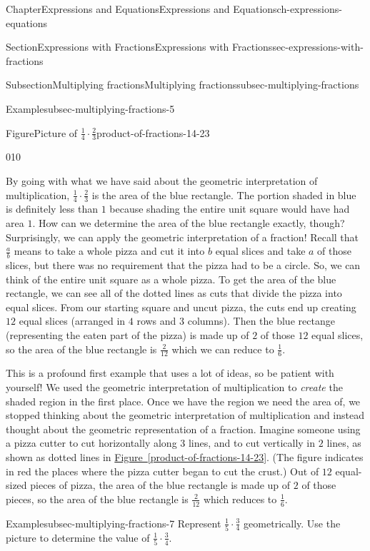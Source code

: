 \documentclass[twoside,11pt,]{book}
\newcommand{\xreffont}{\relax}
\numberwithin{equation}{chapter}
\begin{document}
\begin{chapterptx}{Chapter}{Expressions and Equations}{}{Expressions and Equations}{}{}{ch-expressions-equations}
\begin{sectionptx}{Section}{Expressions with Fractions}{}{Expressions with Fractions}{}{}{sec-expressions-with-fractions}
\begin{subsectionptx}{Subsection}{Multiplying fractions}{}{Multiplying fractions}{}{}{subsec-multiplying-fractions}
\begin{example}{Example}{}{subsec-multiplying-fractions-5}
\begin{figureptx}{Figure}{Picture of \(\frac14 \cdot \frac23\)}{product-of-fractions-14-23}{}
\begin{image}{0}{1}{0}{}
{%
}%
\end{image}%
\tcblower
\end{figureptx}%
 By going with what we have said about the geometric interpretation of multiplication, \(\frac14 \cdot \frac23\) is the area of the blue rectangle. The portion shaded in blue is definitely less than \(1\) because shading the entire unit square would have had area \(1\). How can we determine the area of the blue rectangle exactly, though? Surprisingly, we can apply the geometric interpretation of a fraction! Recall that \(\frac{a}{b}\) means to take a whole pizza and cut it into \(b\) equal slices and take \(a\) of those slices, but there was no requirement that the pizza had to be a circle. So, we can think of the entire unit square as a whole pizza. To get the area of the blue rectangle, we can see all of the dotted lines as cuts that divide the pizza into equal slices. From our starting square and uncut pizza, the cuts end up creating \(12\) equal slices (arranged in \(4\) rows and \(3\) columns). Then the blue rectange (representing the eaten part of the pizza) is made up of \(2\) of those \(12\) equal slices, so the area of the blue rectangle is \(\frac{2}{12}\) which we can reduce to \(\frac16\).%
\end{example}
This is a profound first example that uses a lot of ideas, so be patient with yourself! We used the geometric interpretation of multiplication to \emph{create} the shaded region in the first place. Once we have the region we need the area of, we stopped thinking about the geometric interpretation of multiplication and instead thought about the geometric representation of a fraction. Imagine someone using a pizza cutter to cut horizontally along \(3\) lines, and to cut vertically in \(2\) lines, as shown as dotted lines in \hyperref[product-of-fractions-14-23]{Figure~{\xreffont\ref{product-of-fractions-14-23}}}. (The figure indicates in red the places where the pizza cutter began to cut the crust.) Out of \(12\) equal-sized pieces of pizza, the area of the blue rectangle is made up of \(2\) of those pieces, so the area of the blue rectangle is \(\frac{2}{12}\) which reduces to \(\frac16\).%
\begin{example}{Example}{}{subsec-multiplying-fractions-7}%
Represent \(\frac15 \cdot \frac34\) geometrically. Use the picture to determine the value of \(\frac15 \cdot \frac34\).%

\end{example}
\end{subsectionptx}
\end{sectionptx}
\end{chapterptx}
\end{document}
